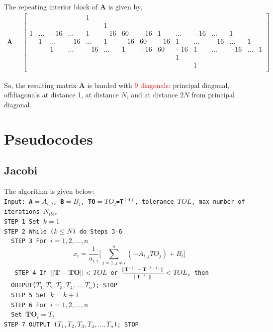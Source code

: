 \documentclass[12pt]{amsart}   %
\begin{document}
The repeating interior block of $\mathbf{A}$ is given by,
                    \begin{align*}
                    \mathbf{A} = \left[\begin{smallmatrix}
                  &&&&1\\
                  &&&&&1\\ 1&\hdots&-16&\hdots&1&-16&60&-16&1&\hdots&-16&\hdots& 1\\
                    &1&\hdots&-16&\hdots&1&-16&60&-16&1&\hdots&-16&\hdots& 1\\
                    &&1&\hdots&-16&\hdots&1&-16&60&-16&1&\hdots&-16&\hdots& 1\\
                    &&&&&&&&&1\\
                    &&&&&&&&&&1\\
                    \end{smallmatrix}\right]
                \end{align*}

So, the resulting matrix \textbf{A} is banded with \textcolor{red}{9 diagonals}: principal diagonal, offdiagonals at distance 1, at distance $N$, and at distance $2N$ from principal diagonal.

\section{Pseudocodes \cite{atkinson1985elementary}}
\subsection{Jacobi} The algorithm is given below: \\
{\tt{Input: \textbf{A}$= A_{i,j}$, \textbf{B}$=B_j$, \textbf{TO}$=TO_j$=\textbf{T}$^{(0)}$, tolerance $TOL$, max number of iterations $N_{iter}$ \\
STEP 1 Set $k=1$ \\
STEP 2 While ($k \leq N$) do Steps 3-6 \\
\textcolor{white}{.}\hspace{1cm} STEP 3 For $i=1,2,...,n$
\begin{equation*}
    x_{i}= \frac{1}{a_{i,i}}\bigg[ \sum_{j=1,j\neq i}^n (-A_{i,j} TO_j)+B_i \bigg]
    \end{equation*}
\textcolor{white}{.}\hspace{1cm} STEP 4 If $||\textbf{T}-\textbf{TO}||<TOL$ or $\frac{||\textbf{T}^{(k)}-\textbf{T}^{(k-1)}||}{||\textbf{T}^{(k)}||}<TOL$, then \\ \textcolor{white}{.}\hspace{6cm} OUTPUT($T_1,T_2,T_3,T_4,...,T_n$); {STOP} \\
\textcolor{white}{.}\hspace{1cm} STEP 5 Set $k=k+1$ \\
\textcolor{white}{.}\hspace{1cm} STEP 6 For $i=1,2,...,n$\\
\textcolor{white}{.}\hspace{2.5cm} Set $\textbf{TO}_i = T_i$\\
STEP 7 OUTPUT ($T_1,T_2,T_3,T_4,...,T_n$); STOP\\
}} \\
\end{document}
